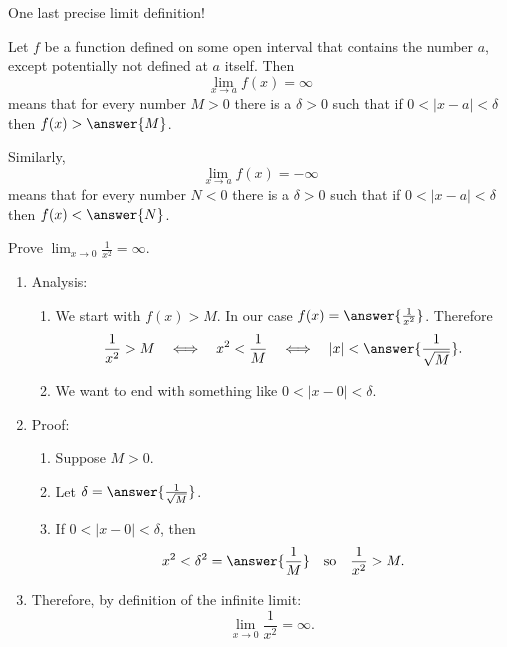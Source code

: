 \documentclass{ximera}
\begin{document}
One last precise limit definition!

\begin{definition}
\label{definition:3-3}
Let $f$ be a function defined on some open interval that contains the number $a$, except potentially not defined at $a$ itself.
Then
\[
\lim_{x \rightarrow a} f(x)=\infty
\]
means that for every number $M>0$ there is a $\delta>0$ such that if $0<|x-a|<\delta$ then $f(x)>\answer{M}$.

Similarly,
\[
\lim_{x \rightarrow a} f(x)=-\infty
\]
means that for every number $N<0$ there is a $\delta>0$ such that if $0<|x-a|<\delta$ then $f(x)<\answer{N}$.
\end{definition}

\begin{example}
\label{example:3-4}
Prove $\lim_{x \rightarrow 0} \frac{1}{x^{2}}=\infty$.

\begin{enumerate}
  \item Analysis:
  \begin{enumerate}
    \item We start with $f(x)>M$. In our case $f(x)=\answer{\frac{1}{x^{2}}}$. Therefore
    \[
    \frac{1}{x^{2}}>M \quad\Longleftrightarrow\quad x^{2}<\frac{1}{M} \quad\Longleftrightarrow\quad |x|<\answer{\frac{1}{\sqrt{M}}}.
    \]
    \item We want to end with something like $0<|x-0|<\delta$.
  \end{enumerate}
  \item Proof:
  \begin{enumerate}
    \item Suppose $M>0$.
    \item Let $\delta=\answer{\frac{1}{\sqrt{M}}}$.
    \item If $0<|x-0|<\delta$, then
    \[
    x^{2}<\delta^{2}=\answer{\frac{1}{M}} \quad\text{so}\quad \frac{1}{x^{2}}>M.
    \]
  \end{enumerate}
  \item Therefore, by definition of the infinite limit:
  \[
  \lim_{x \rightarrow 0} \frac{1}{x^{2}}=\infty.
  \]
\end{enumerate}
\end{example}
\end{document}
